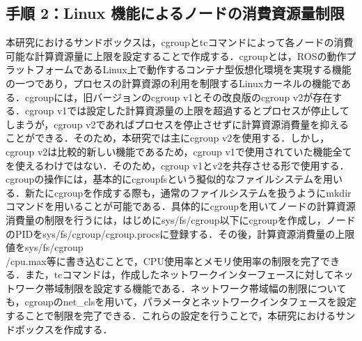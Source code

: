 \documentclass[11pt]{ujarticle} %
\begin{document}
\subsection{手順 2：Linux 機能によるノードの消費資源量制限}
本研究におけるサンドボックスは，cgroupとtcコマンドによって各ノードの消費可能な計算資源量に上限を設定することで作成する．cgroupとは，ROSの動作プラットフォームであるLinux上で動作するコンテナ型仮想化環境を実現する機能の一つであり，プロセスの計算資源の利用を制限するLinuxカーネルの機能である\cite{cgroupMan}．cgroupには，旧バージョンのcgroup v1とその改良版のcgroup v2が存在する．cgroup v1では設定した計算資源量の上限を超過するとプロセスが停止してしまうが，cgroup v2であればプロセスを停止させずに計算資源消費量を抑えることができる．そのため，本研究では主にcgroup v2を使用する．しかし，cgroup v2は比較的新しい機能であるため，cgroup v1で使用されていた機能全てを使えるわけではない．そのため，cgroup v1とv2を共存させる形で使用する．cgroupの操作には，基本的にcgroupfsという擬似的なファイルシステムを用いる．新たにcgroupを作成する際も，通常のファイルシステムを扱うようにmkdirコマンドを用いることが可能である．具体的にcgroupを用いてノードの計算資源消費量の制限を行うには，はじめにsys/fs/cgroup以下にcgroupを作成し，ノードのPIDをsys/fs/cgroup/cgroup.procsに登録する．その後，計算資源消費量の上限値をsys/fs/cgroup\\/cpu.max等に書き込むことで，CPU使用率とメモリ使用率の制限を完了できる．また，tcコマンドは，作成したネットワークインターフェースに対してネットワーク帯域制限を設定する機能である．ネットワーク帯域幅の制限についても，cgroupのnet\_clsを用いて，パラメータとネットワークインタフェースを設定することで制限を完了できる．これらの設定を行うことで，本研究におけるサンドボックスを作成する．
\end{document}

